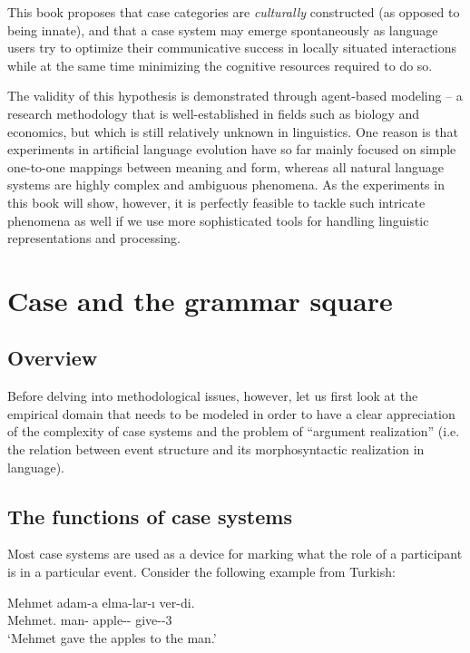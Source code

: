 This book proposes that case categories are {\em culturally} constructed (as opposed to being innate), and that a case system may emerge spontaneously as language users try to optimize their communicative success in locally situated interactions while at the same time minimizing the cognitive resources required to do so. 

The validity of this hypothesis is demonstrated through agent-based modeling -- a research methodology that is well-established in fields such as biology and economics, but which is still relatively unknown in linguistics. One reason is that experiments in artificial language evolution have so far mainly focused on simple one-to-one mappings between meaning and form, whereas all natural language systems are highly complex and ambiguous phenomena. As the experiments in this book will show, however, it is perfectly feasible to tackle such intricate phenomena as well if we use more sophisticated tools for handling linguistic representations and processing. 

\section{Case and the grammar square}
\label{s:grammar-square}
\subsection{Overview}  
Before delving into methodological issues, however, let us first look at the empirical domain that needs to be modeled in order to have a clear appreciation of the complexity of case systems and the problem of ``argument realization'' (i.e. the relation between event structure and its morphosyntactic realization in language).

\subsection{The functions of case systems}
\label{s:case-functions}

Most case systems are used as a device for marking what the role of a participant is in a particular event. Consider the following example from Turkish:

\label{e:case1}
\ea
\gll Mehmet adam-a elma-lar-ı ver-di. \\
	Mehmet.{\nom} man-{\dat} apple-{\pl}-{\acc} give-{\pst}-3{\sg} \\
\glt `Mehmet gave the apples to the man.' \citep[1, example 1]{blake94case}
\z

